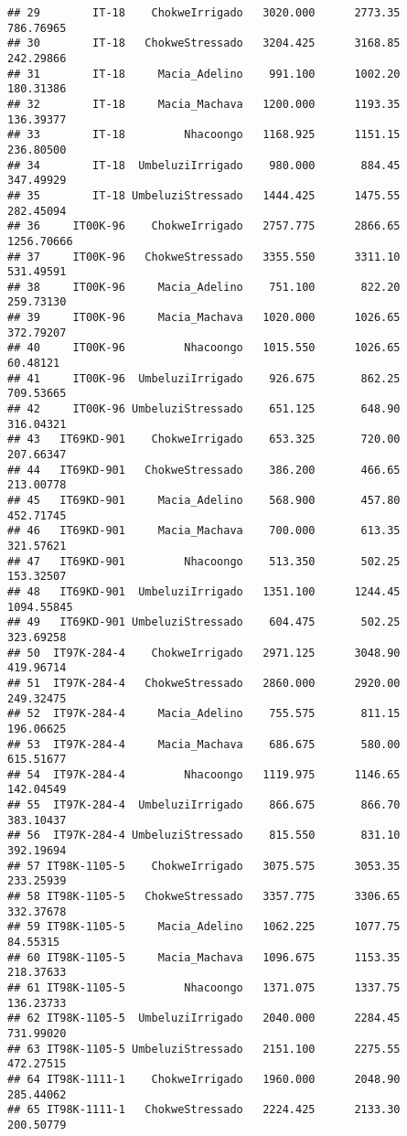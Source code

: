 \documentclass[]{book}
\theoremstyle{definition}
\theoremstyle{definition}
\theoremstyle{definition}
\theoremstyle{remark}
\begin{document}
\begin{verbatim}
## 29        IT-18    ChokweIrrigado   3020.000      2773.35  786.76965
## 30        IT-18   ChokweStressado   3204.425      3168.85  242.29866
## 31        IT-18     Macia_Adelino    991.100      1002.20  180.31386
## 32        IT-18     Macia_Machava   1200.000      1193.35  136.39377
## 33        IT-18         Nhacoongo   1168.925      1151.15  236.80500
## 34        IT-18  UmbeluziIrrigado    980.000       884.45  347.49929
## 35        IT-18 UmbeluziStressado   1444.425      1475.55  282.45094
## 36     IT00K-96    ChokweIrrigado   2757.775      2866.65 1256.70666
## 37     IT00K-96   ChokweStressado   3355.550      3311.10  531.49591
## 38     IT00K-96     Macia_Adelino    751.100       822.20  259.73130
## 39     IT00K-96     Macia_Machava   1020.000      1026.65  372.79207
## 40     IT00K-96         Nhacoongo   1015.550      1026.65   60.48121
## 41     IT00K-96  UmbeluziIrrigado    926.675       862.25  709.53665
## 42     IT00K-96 UmbeluziStressado    651.125       648.90  316.04321
## 43   IT69KD-901    ChokweIrrigado    653.325       720.00  207.66347
## 44   IT69KD-901   ChokweStressado    386.200       466.65  213.00778
## 45   IT69KD-901     Macia_Adelino    568.900       457.80  452.71745
## 46   IT69KD-901     Macia_Machava    700.000       613.35  321.57621
## 47   IT69KD-901         Nhacoongo    513.350       502.25  153.32507
## 48   IT69KD-901  UmbeluziIrrigado   1351.100      1244.45 1094.55845
## 49   IT69KD-901 UmbeluziStressado    604.475       502.25  323.69258
## 50  IT97K-284-4    ChokweIrrigado   2971.125      3048.90  419.96714
## 51  IT97K-284-4   ChokweStressado   2860.000      2920.00  249.32475
## 52  IT97K-284-4     Macia_Adelino    755.575       811.15  196.06625
## 53  IT97K-284-4     Macia_Machava    686.675       580.00  615.51677
## 54  IT97K-284-4         Nhacoongo   1119.975      1146.65  142.04549
## 55  IT97K-284-4  UmbeluziIrrigado    866.675       866.70  383.10437
## 56  IT97K-284-4 UmbeluziStressado    815.550       831.10  392.19694
## 57 IT98K-1105-5    ChokweIrrigado   3075.575      3053.35  233.25939
## 58 IT98K-1105-5   ChokweStressado   3357.775      3306.65  332.37678
## 59 IT98K-1105-5     Macia_Adelino   1062.225      1077.75   84.55315
## 60 IT98K-1105-5     Macia_Machava   1096.675      1153.35  218.37633
## 61 IT98K-1105-5         Nhacoongo   1371.075      1337.75  136.23733
## 62 IT98K-1105-5  UmbeluziIrrigado   2040.000      2284.45  731.99020
## 63 IT98K-1105-5 UmbeluziStressado   2151.100      2275.55  472.27515
## 64 IT98K-1111-1    ChokweIrrigado   1960.000      2048.90  285.44062
## 65 IT98K-1111-1   ChokweStressado   2224.425      2133.30  200.50779

\end{verbatim}
\end{document}
